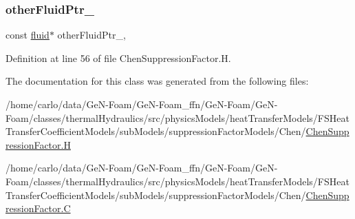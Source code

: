 \subsubsection{\texorpdfstring{other\+Fluid\+Ptr\+\_\+}{otherFluidPtr\_}}
{\footnotesize\ttfamily const \hyperlink{classFoam_1_1fluid}{fluid}$\ast$ other\+Fluid\+Ptr\+\_\+\hspace{0.3cm}{\ttfamily [mutable]}, {\ttfamily [protected]}}



Definition at line 56 of file Chen\+Suppression\+Factor.\+H.



The documentation for this class was generated from the following files\+:\begin{DoxyCompactItemize}
\item 
/home/carlo/data/\+Ge\+N-\/\+Foam/\+Ge\+N-\/\+Foam\+\_\+ffn/\+Ge\+N-\/\+Foam/\+Ge\+N-\/\+Foam/classes/thermal\+Hydraulics/src/physics\+Models/heat\+Transfer\+Models/\+F\+S\+Heat\+Transfer\+Coefficient\+Models/sub\+Models/suppression\+Factor\+Models/\+Chen/\hyperlink{ChenSuppressionFactor_8H}{Chen\+Suppression\+Factor.\+H}\item 
/home/carlo/data/\+Ge\+N-\/\+Foam/\+Ge\+N-\/\+Foam\+\_\+ffn/\+Ge\+N-\/\+Foam/\+Ge\+N-\/\+Foam/classes/thermal\+Hydraulics/src/physics\+Models/heat\+Transfer\+Models/\+F\+S\+Heat\+Transfer\+Coefficient\+Models/sub\+Models/suppression\+Factor\+Models/\+Chen/\hyperlink{ChenSuppressionFactor_8C}{Chen\+Suppression\+Factor.\+C}\end{DoxyCompactItemize}

